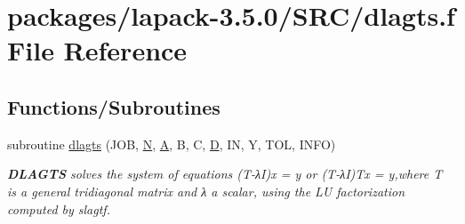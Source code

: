 \hypertarget{dlagts_8f}{}\section{packages/lapack-\/3.5.0/\+S\+R\+C/dlagts.f File Reference}
\label{dlagts_8f}
\subsection*{Functions/\+Subroutines}
\begin{DoxyCompactItemize}
\item 
subroutine \hyperlink{group__auxOTHERauxiliary_ga0fbc9a87ffa4a60adadcb4fc511c2556}{dlagts} (J\+O\+B, \hyperlink{polmisc_8c_a0240ac851181b84ac374872dc5434ee4}{N}, \hyperlink{classA}{A}, B, C, \hyperlink{odrpack_8h_a7dae6ea403d00f3687f24a874e67d139}{D}, I\+N, Y, T\+O\+L, I\+N\+F\+O)
\begin{DoxyCompactList}\small\item\em {\bfseries D\+L\+A\+G\+T\+S} solves the system of equations (T-\/λ\+I)x = y or (T-\/λ\+I)Tx = y,where T is a general tridiagonal matrix and λ a scalar, using the L\+U factorization computed by slagtf. \end{DoxyCompactList}\end{DoxyCompactItemize}
